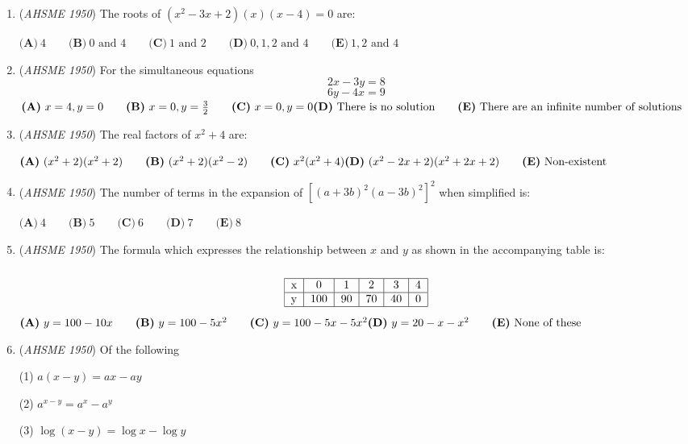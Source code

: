 \begin{enumerate}
	\item (\textit{AHSME 1950}) The roots of $(x^{2}-3x+2)(x)(x-4)=0$ are:


 $\textbf{(A)}\ 4\qquad\textbf{(B)}\ 0\text{ and }4\qquad\textbf{(C)}\ 1\text{ and }2\qquad\textbf{(D)}\ 0,1,2\text{ and }4\qquad\textbf{(E)}\ 1,2\text{ and }4$


	\item (\textit{AHSME 1950}) For the simultaneous equations 
 \[2x-3y=8\]
 \[6y-4x=9\]
$\textbf{(A)}\ x=4,y=0\qquad\textbf{(B)}\ x=0,y=\frac{3}{2}\qquad\textbf{(C)}\ x=0,y=0\qquad\\ \textbf{(D)}\ \text{There is no solution}\qquad\textbf{(E)}\ \text{There are an infinite number of solutions}$


	\item (\textit{AHSME 1950}) The real factors of $x^2+4$ are:


 $\textbf{(A)}\ (x^{2}+2)(x^{2}+2)\qquad\textbf{(B)}\ (x^{2}+2)(x^{2}-2)\qquad\textbf{(C)}\ x^{2}(x^{2}+4)\qquad\\ \textbf{(D)}\ (x^{2}-2x+2)(x^{2}+2x+2)\qquad\textbf{(E)}\ \text{Non-existent}$


	\item (\textit{AHSME 1950}) The number of terms in the expansion of $[(a+3b)^{2}(a-3b)^{2}]^{2}$ when simplified is:


 $\textbf{(A)}\ 4\qquad\textbf{(B)}\ 5\qquad\textbf{(C)}\ 6\qquad\textbf{(D)}\ 7\qquad\textbf{(E)}\ 8$


	\item (\textit{AHSME 1950}) The formula which expresses the relationship between $x$ and $y$ as shown in the accompanying table is:


 
 \[\begin{tabular}[t]{|c|c|c|c|c|c|}\hline x&0&1&2&3&4\\\hline y&100&90&70&40&0\\\hline\end{tabular}\]
$\textbf{(A)}\ y=100-10x\qquad\textbf{(B)}\ y=100-5x^{2}\qquad\textbf{(C)}\ y=100-5x-5x^{2}\qquad\\ \textbf{(D)}\ y=20-x-x^{2}\qquad\textbf{(E)}\ \text{None of these}$


	\item (\textit{AHSME 1950}) Of the following 


 (1) $a(x-y)=ax-ay$


 (2) $a^{x-y}=a^x-a^y$


 (3) $\log (x-y)=\log x-\log y$



\end{enumerate}

